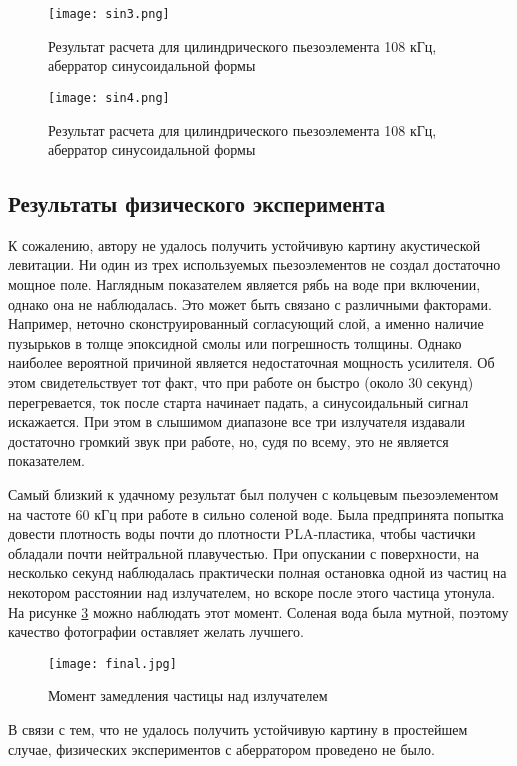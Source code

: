 \begin{figure}[H]
	\centering
	\texttt{[image: sin3.png]}
	\caption{Результат расчета для цилиндрического пьезоэлемента 108 кГц, аберратор синусоидальной формы}
	\label{fig:sin3}
\end{figure}

\begin{figure}[H]
	\centering
	\texttt{[image: sin4.png]}
	\caption{Результат расчета для цилиндрического пьезоэлемента 108 кГц, аберратор синусоидальной формы}
	\label{fig:sin4}
\end{figure}

\subsection{Результаты физического эксперимента}
К сожалению, автору не удалось получить устойчивую картину акустической левитации. Ни один из трех используемых пьезоэлементов не создал достаточно мощное поле. Наглядным показателем является рябь на воде при включении, однако она не наблюдалась. Это может быть связано с различными факторами. Например, неточно сконструированный согласующий слой, а именно наличие пузырьков в толще эпоксидной смолы или погрешность толщины. Однако наиболее вероятной причиной является недостаточная мощность усилителя. Об этом свидетельствует тот факт, что при работе он быстро (около 30 секунд) перегревается, ток после старта начинает падать, а синусоидальный сигнал искажается. При этом в слышимом диапазоне все три излучателя издавали достаточно громкий звук при работе, но, судя по всему, это не является показателем.

Самый близкий к удачному результат был получен с кольцевым пьезоэлементом на частоте 60 кГц при работе в сильно соленой воде. Была предпринята попытка довести плотность воды почти до плотности PLA-пластика, чтобы частички обладали почти нейтральной плавучестью. При опускании с поверхности, на несколько секунд наблюдалась практически полная остановка одной из частиц на некотором расстоянии над излучателем, но вскоре после этого частица утонула. На рисунке \ref{fig:final} можно наблюдать этот момент. Соленая вода была мутной, поэтому качество фотографии оставляет желать лучшего.

\begin{figure}[H]
	\centering
	\texttt{[image: final.jpg]}
	\caption{Момент замедления частицы над излучателем}
	\label{fig:final}
\end{figure} 

В связи с тем, что не удалось получить устойчивую картину в простейшем случае, физических экспериментов с аберратором проведено не было. 
\newpage
